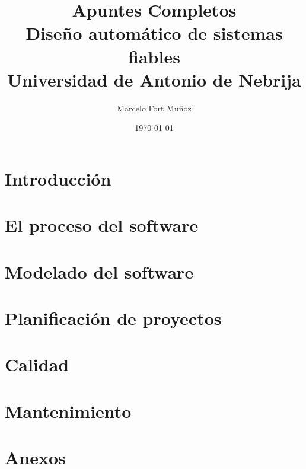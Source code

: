 \documentclass[a4paper,11pt]{report}
\title{Apuntes Completos \\[1ex] \large Diseño automático de sistemas fiables \\ Universidad de Antonio de Nebrija}
\author{Marcelo Fort Muñoz}
\date{\today}
\begin{document}

    \maketitle
    \tableofcontents
    \newpage




    \chapter{Introducción}\label{ch:introduccion}
    


    \chapter{El proceso del software}\label{ch:el-proceso-del-software}
    


    \chapter{Modelado del software}\label{ch:modelado-del-software}
    


    \chapter{Planificación de proyectos}\label{ch:planificacion-de-proyectos}
    


    \chapter{Calidad}\label{ch:calidad}
    


    \chapter{Mantenimiento}\label{ch:mantenimiento}
    

    \chapter*{Anexos}
    
\end{document}
